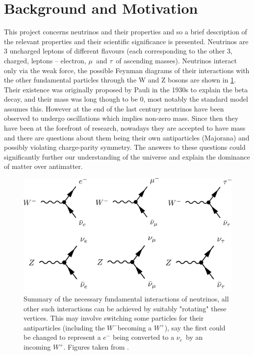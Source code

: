\documentclass[a4paper,12pt]{article}
\newcommand{\Mu}{$\mu$}
\newcommand{\Tau}{$\tau$}
\newcommand{\Ne}{$\nu_e$}
\newcommand{\Wp}{$W^+$}
\newcommand{\Wm}{$W^-$}
\begin{document}
\newpage

\section{Background and Motivation}
This project concerns neutrinos and their properties and so a brief description of the relevant properties and their scientific significance is presented.
Neutrinos are 3 uncharged leptons of different flavours (each corresponding to the other 3, charged, leptons -- electron, \Mu\ and \Tau\ of ascending masses).
Neutrinos interact only via the weak force, the possible Feynman diagrams of their interactions with the other fundamental particles through the W and Z bosons are shown in \cref{fig:nu_feyn}.
Their existence was originally proposed by Pauli in the 1930s to explain the beta decay, and their mass was long though to be 0, most notably the standard model assumes this.
However at the end of the last century neutrinos have been observed to undergo oscillations which implies non-zero mass.
Since then they have been at the forefront of research, nowadays they are accepted to have mass and there are questions about them being their own antiparticles (Majorana) and possibly violating charge-parity symmetry.
The answers to these questions could significantly further our understanding of the universe and explain the dominance of matter over antimatter.

\begin{figure}[h]
    \centering
    \includegraphics{figures/NeutrinoFeynman.jpg}
    \caption{
        Summary of the necessary fundamental interactions of neutrinos, all other such interactions can be achieved by suitably "rotating" these vertices.
        This may involve switching some particles for their antiparticles (including the \Wm becoming a \Wp), say the first could be changed to represent a $e^-$ being converted to a \Ne\ by an incoming \Wp.
        Figures taken from \cite{potterFeynmanDiagramsParticlea}.
    }\label{fig:nu_feyn}
\end{figure}
\end{document}
